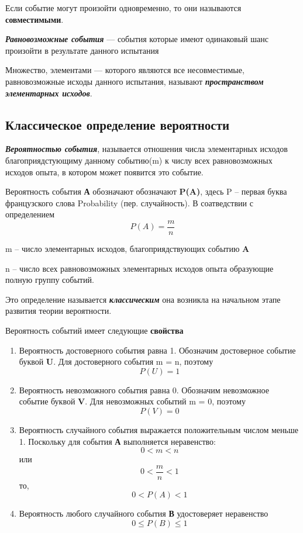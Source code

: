 \documentclass[a5paper]{article}
\begin{document}
	Если событие могут произойти одновременно, то они называются \textbf{совместимыми}.
	
	\textbf{\textit{Равновозможные события}} --- события которые имеют одинаковый шанс произойти в результате данного испытания
	
	Множество, элементами --- которого являются все несовместимые, равновозможные исходы данного испытания, называют \textbf{\textit{пространством элементарных исходов}}.
	
	\newpage
	\subsection{Классическое определение вероятности}
	
	\textbf{\textit{Вероятностью события}}, называется отношения числа элементарных исходов благоприядстующиму данному событию(m) к числу всех равновозможных исходов опыта, в котором может появится это событие.
	
	\begin{itshape}
		Вероятность события \textbf{А} обозначают обозначают \textbf{P(A)}, здесь P -- первая буква французского слова Probability (пер. случайность). В соатведствии с определением 
		\[ P(A) = \dfrac{m}{n} \]  
		
		m -- число элементарных исходов, благоприядствующих событию \textbf{A}
		
		n -- число всех равновозможных элементарных исходов опыта образующие полную группу событий.
	\end{itshape}

	Это определение называется \textbf{\textit{классическим}} она возникла на начальном этапе развития теории вероятности.
	
	Вероятность событий имеет следующие \textbf{свойства} 
	\begin{enumerate}
		\item Вероятность достоверного события равна 1. Обозначим достоверное событие буквой \textbf{U}. Для достоверного события m = n, поэтому 
		\[ P(U) = 1 \]
		\item Вероятность невозможного события равна 0. Обозначим невозможное событие буквой \textbf{V}. Для невозможных событий m = 0, поэтому 
		\[ P(V) = 0 \]
		\item Вероятность случайного события выражается положительным числом меньше 1. Поскольку для события \textbf{А} выполняется неравенство:
		\[ 0 < m < n \]
		или 
		\[0 < \dfrac{m}{n} < 1 \]
		то,
		 \[  0 < P(A) < 1 \]
		\item Вероятность любого случайного события \textbf{В} удостоверяет неравенство 
		\[ 0\leq P(B)\leq 1  \]
	\end{enumerate}	
	
\end{document}
